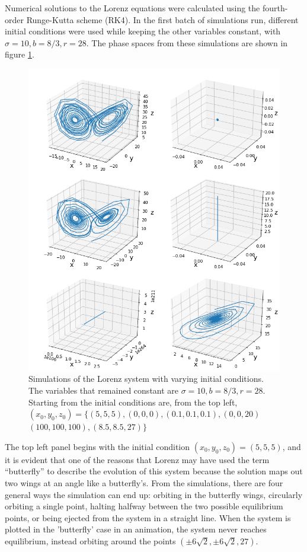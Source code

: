\documentclass[twocolumn]{article}
\begin{document}
Numerical solutions to the Lorenz equations were calculated using the
fourth-order Runge-Kutta scheme (RK4). In the first batch of simulations run,
different initial conditions were used while keeping the other variables
constant, with $\sigma = 10, b = 8/3, r = 28$. The phase spaces from these
simulations are shown in figure \ref{fig:sims_init}.

\begin{figure}
	\includegraphics[width=\linewidth]{sims1.png}
	\caption{
		Simulations of the Lorenz system with varying initial conditions. The
		variables that remained constant are $\sigma=10, b=8/3, r=28$. Starting from
		the initial conditions are, from the top left,
		$(x_0, y_0, z_0) = \{
		(5, 5, 5),(0, 0, 0),
		(0.1, 0.1, 0.1), (0, 0, 20)$ $
		(100, 100, 100), (8.5,8.5, 27) \}$
	}
	\label{fig:sims_init}
\end{figure}

The top left panel begins with the initial condition $(x_0, y_0, z_0) = (5, 5,
5)$, and it is evident that one of the reasons that Lorenz may have used the
term ``butterfly'' to describe the evolution of this system because the solution
maps out two wings at an angle like a butterfly's. From the simulations, there
are four general ways the simulation can end up: orbiting in the butterfly
wings, circularly orbiting a single point, halting halfway between the two possible equilibrium points, or being ejected from the system in a straight line. When the system is plotted in the 'butterfly' case in an animation, the system never reaches equilibrium, instead orbiting around the points $(\pm 6\sqrt{2},\pm 6\sqrt{2}, 27)$. 
\end{document}
